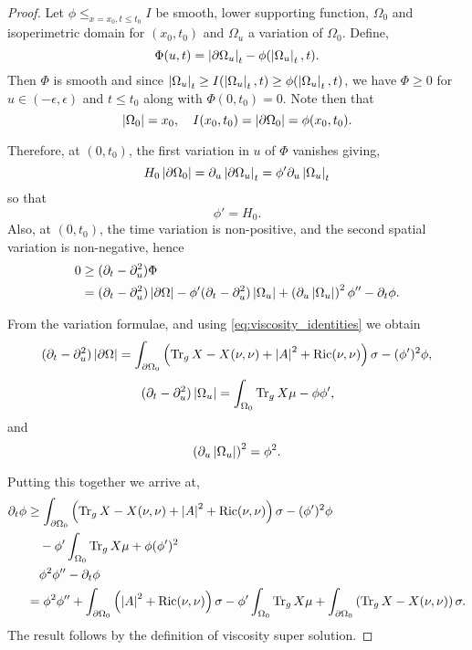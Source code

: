 \documentclass{amsart}
\begin{document}
\begin{proof}
Let \(\phi \leq_{x=x_0, t\leq t_0} I\) be smooth, lower supporting function, \(\Omega_0\) and isoperimetric domain for \((x_0, t_0)\) and \(\Omega_u\) a variation of \(\Omega_0\). Define,
\[
\Phi(u, t) = \left|{\partial {\Omega_u}}\right|_t - \phi(\left|{\Omega_u}\right|_t, t).
\]
Then \(\Phi\) is smooth and since \(\left|{\Omega_u}\right|_t \geq I(\left|{\Omega_u}\right|_t, t) \geq \phi(\left|{\Omega_u}\right|_t, t)\), we have \(\Phi \geq 0\) for \(u \in (-\epsilon, \epsilon)\) and \(t \leq t_0\) along with \(\Phi(0, t_0) = 0\). Note then that
\begin{equation}
\label{eq:viscosity_identities}
\left|{\Omega_0}\right| = x_0, \quad I(x_0, t_0) = \left|{\partial {\Omega_0}}\right| = \phi(x_0, t_0).
\end{equation}

Therefore, at \((0, t_0)\), the first variation in \(u\) of \(\Phi\) vanishes giving,
\[
H_0 \left|{\partial {\Omega_0}}\right| = \partial_u \left|{\partial {\Omega_u}}\right|_t = \phi' \partial_u \left|{\Omega_u}\right|_t
\]
so that
\[
\phi' = H_0.
\]
Also, at \((0, t_0)\), the time variation is non-positive, and the second spatial variation is non-negative, hence
\[
\begin{split}
0 &\geq (\partial_t - \partial_u^2) \Phi \\
&= (\partial_t - \partial_u^2) \left|{\partial {\Omega}}\right| - \phi'(\partial_t - \partial_u^2) \left|{\Omega_u}\right| + \left(\partial_u \left|{\Omega_u}\right|\right)^2 \phi'' - \partial_t \phi.
\end{split}
\]

From the variation formulae, and using \eqref{eq:viscosity_identities} we obtain
\[
(\partial_t - \partial_u^2) \left|{\partial {\Omega}}\right| = \int_{\partial {\Omega_0}} \left(\operatorname{Tr}_g X - X(\nu, \nu) + \left|{A}\right|^2 + \operatorname{Ric}(\nu, \nu)\right) \sigma - (\phi')^2 \phi,
\]
\[
(\partial_t - \partial_u^2) \left|{\Omega_u}\right| = \int_{\Omega_0} \operatorname{Tr}_g X \mu - \phi \phi',
\]
and
\[
\left(\partial_u \left|{\Omega_u}\right|\right)^2 = \phi^2.
\]

Putting this together we arrive at,
\[
\begin{split}
\partial_t \phi &\geq \int_{\partial {\Omega_0}} \left(\operatorname{Tr}_g X - X(\nu, \nu) + \left|{A}\right|^2 + \operatorname{Ric}(\nu, \nu) \right)\sigma - (\phi')^2 \phi \\
&\quad - \phi'\int_{\Omega_0} \operatorname{Tr}_g X \mu + \phi (\phi')^2 \\
&\quad \phi^2 \phi'' -\partial_t \phi \\
&= \phi^2 \phi'' + \int_{\partial {\Omega_0}} \left(\left|{A}\right|^2 + \operatorname{Ric}(\nu, \nu)\right) \sigma - \phi'\int_{\Omega_0} \operatorname{Tr}_g X \mu + \int_{\partial {\Omega_0}} \left(\operatorname{Tr}_g X - X(\nu, \nu)\right) \sigma.
\end{split}
\]
The result follows by the definition of viscosity super solution.
\end{proof}
\end{document}
